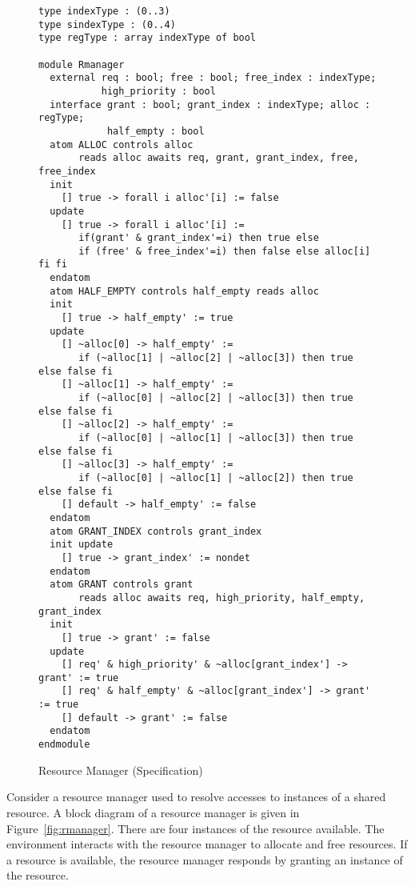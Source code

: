 {\begin{figure}
\small
\begin{verbatim}
type indexType : (0..3)
type sindexType : (0..4)
type regType : array indexType of bool

module Rmanager
  external req : bool; free : bool; free_index : indexType;
           high_priority : bool
  interface grant : bool; grant_index : indexType; alloc : regType;
            half_empty : bool
  atom ALLOC controls alloc
       reads alloc awaits req, grant, grant_index, free, free_index
  init
    [] true -> forall i alloc'[i] := false
  update
    [] true -> forall i alloc'[i] :=
       if(grant' & grant_index'=i) then true else
       if (free' & free_index'=i) then false else alloc[i] fi fi
  endatom
  atom HALF_EMPTY controls half_empty reads alloc
  init
    [] true -> half_empty' := true
  update
    [] ~alloc[0] -> half_empty' :=
       if (~alloc[1] | ~alloc[2] | ~alloc[3]) then true else false fi
    [] ~alloc[1] -> half_empty' :=
       if (~alloc[0] | ~alloc[2] | ~alloc[3]) then true else false fi
    [] ~alloc[2] -> half_empty' :=
       if (~alloc[0] | ~alloc[1] | ~alloc[3]) then true else false fi
    [] ~alloc[3] -> half_empty' :=
       if (~alloc[0] | ~alloc[1] | ~alloc[2]) then true else false fi
    [] default -> half_empty' := false
  endatom
  atom GRANT_INDEX controls grant_index
  init update
    [] true -> grant_index' := nondet
  endatom
  atom GRANT controls grant
       reads alloc awaits req, high_priority, half_empty, grant_index
  init
    [] true -> grant' := false
  update
    [] req' & high_priority' & ~alloc[grant_index'] -> grant' := true
    [] req' & half_empty' & ~alloc[grant_index'] -> grant' := true
    [] default -> grant' := false
  endatom
endmodule
\end{verbatim}
\caption{Resource Manager (Specification)}
\label{fig:rmanagerspec}
\end{figure}

Consider a resource manager used to resolve accesses to instances of a
shared resource. A block diagram of a resource manager is given in
Figure~\ref{fig:rmanager}. There are four instances of the resource
available. The environment interacts with the resource manager to
allocate and free resources. If a resource is available, the resource
manager responds by granting an instance of the resource.


}

